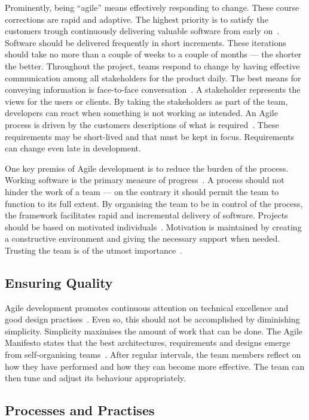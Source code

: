 \documentclass[english]{tktltiki2}
\begin{document}
Prominently, being “agile” means effectively responding to change. These course corrections are rapid and adaptive. The highest priority is to satisfy the customers trough continuously delivering valuable software from early on~\cite{BBB01b}. Software should be delivered frequently in short increments. These iterations should take no more than a couple of weeks to a couple of months — the shorter the better. Throughout the project, teams respond to change by having effective communication among all stakeholders for the product daily. The best means for conveying information is face-to-face conversation~\cite{BBB01b}. A stakeholder represents the views for the users or clients. By taking the stakeholders as part of the team, developers can react when something is not working as intended. An Agile process is driven by the customers descriptions of what is required~\cite{BBB01b}. These requirements may be short-lived and that must be kept in focus. Requirements can change even late in development.

One key premiss of Agile development is to reduce the burden of the process. Working software is the primary measure of progress~\cite{BBB01b}. A process should not hinder the work of a team — on the contrary it should permit the team to function to its full extent. By organising the team to be in control of the process, the framework facilitates rapid and incremental delivery of software. Projects should be based on motivated individuals~\cite{BBB01b}. Motivation is maintained by creating a constructive environment and giving the necessary support when needed. Trusting the team is of the utmost importance~\cite{BBB01b}.

\subsection{Ensuring Quality}

Agile development promotes continuous attention on technical excellence and good design practises~\cite{BBB01b}. Even so, this should not be accomplished by diminishing simplicity. Simplicity maximises the amount of work that can be done. The Agile Manifesto states that the best architectures, requirements and designs emerge from self-organising teams~\cite{BBB01b}. After regular intervals, the team members reflect on how they have performed and how they can become more effective. The team can then tune and adjust its behaviour appropriately.

\subsection{Processes and Practises}
\end{document}

